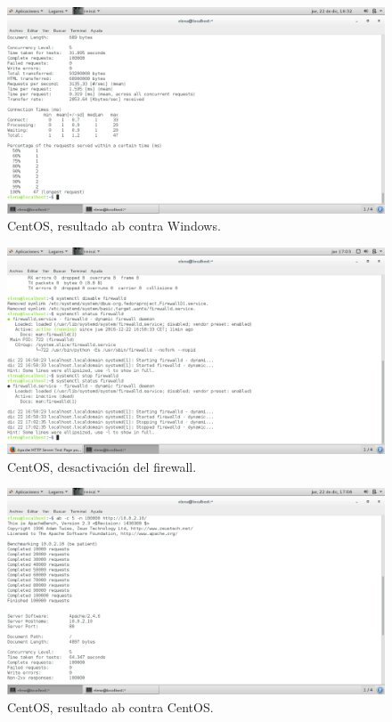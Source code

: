 \begin{figure}[H] 
	\centering
	\includegraphics[width=14.7cm]{./img/ejercicio3_2.png} 	
	\caption{CentOS, resultado ab contra Windows.} \label{fig:ejercicio3_2}
\end{figure}

\begin{figure}[H] 
	\centering
	\includegraphics[width=14.7cm]{./img/ejercicio3_3.png} 	
	\caption{CentOS, desactivación del firewall.} \label{fig:ejercicio3_3}
\end{figure}

\begin{figure}[H] 
	\centering
	\includegraphics[width=14.7cm]{./img/ejercicio3_4.png} 	
	\caption{CentOS, resultado ab contra CentOS.} \label{fig:ejercicio3_4}
\end{figure}

